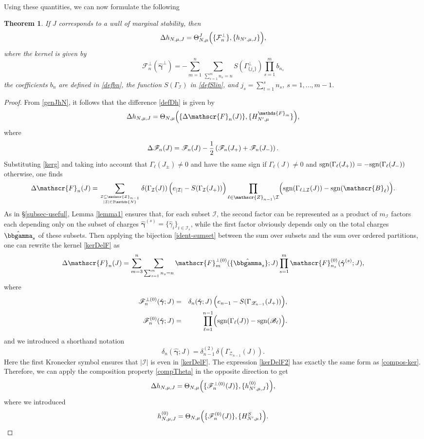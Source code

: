 \documentclass[12pt,letterpaper]{JHEP3}
\def\bea{\begin{eqnarray}}
\def\eea{\end{eqnarray}}
\def\be{\begin{equation}}
\def\ee{\end{equation}}
\newtheorem{theorem}{Theorem}%
\newcommand{\sgn}{{\rm sgn}}
\def\({\left(}
\def\){\right)}
\def\hf{{1\over 2}}
\newcommand{\cF}{\mathcal{F}}
\newcommand{\cI}{\mathcal{I}}
\newcommand{\IN}{\mathds{N}}
\newcommand{\IF}{\mathds{F}}
\def\Bv{\mathscr{B}}
\def\Fv{\mathscr{F}}
\def\Zv{\mathscr{Z}}
\newcommand{\bfgam}{{\boldsymbol \gamma}}
\def\hgam{\hat\gamma}
\def\bfhgam{\hat\bfgam}
\def\Fp{\cF^{\perp}}
\def\hbbgam{\hat\bbgamma}
\begin{document}
Using these quantities, we can now formulate the following
\begin{theorem}
\label{th-wall}
If $J$ corresponds to a wall of marginal stability, then 
\be
\Delta h_{N,\mu,J}
=\Theta^J_{N,\mu}\Bigl(\{\Fp_n\},\{h_{N',\mu,J}\}\Bigr),
\label{DelhNresh}
\ee 
where the kernel is given by
\be 
\Fp_n(\bfhgam^\perp)=-\sum_{m=1}^{n}\sum_{\sum_{s=1}^{m}n_s=n}S(\Gamma^\perp_{\{j_s\}})
\prod_{s=1}^{m} b_{n_s}
\label{kerperp}
\ee 
the coefficients $b_n$ are defined in \eqref{defbn}, the function $S(\Gamma_{\cI})$ in \eqref{defSlin}, and 
$j_s=\sum_{t=1}^s n_s$, $s=1,\dots,m-1$.
\end{theorem}
\begin{proof}
From \eqref{genJhN}, it follows that the difference \eqref{defDh} is given by 
\be
\Delta h_{N,\mu,J}
=\Theta_{N,\mu}\Bigl(\{\Delta\Fv_n(J)\},\{H^{\IF_m}_{N',\mu}\}\Bigr),
\label{DelhN-int}
\ee 	
where 
\be
\Delta\Fv_n(J)=\Fv_n(J)-\hf\(\Fv_n(J_+)+\Fv_n(J_-)\).
\ee
Substituting \eqref{kerg} and taking into account that $\Gamma_\ell(J_\pm)\ne0$ and have the same sign if $\Gamma_\ell(J)\ne 0$
and $\sgn(\Gamma_\ell(J_+))=-\sgn(\Gamma_\ell(J_-))$ otherwise, 
one finds 
\be 
\Delta\Fv_n(J)=
\sum_{\cI\subseteq\Zv_{n-1}\atop |\cI|\in 2\IN}
\delta(\Gamma_\cI(J))\,\Bigl(e_{|\cI|}-S(\Gamma_\cI(J_+))\Bigr)
\prod_{\ell\in \Zv_{n-1}\setminus \cI}\Bigl(\sgn(\Gamma_{\ell\perp\cI}(J))-\sgn(\Bv_\ell)\Bigr).
\label{kerDelF}
\ee 
As in \S\ref{subsec-useful}, Lemma \ref{lemma1} ensures that, for each subset $\cI$, 
the second factor can be represented as a product of $m_\cI$ factors each 
depending only on the subset of charges $\bfhgam^{(s)}=\{\hgam_i\}_{i\in\cI_s}$,
while the first factor obviously depends only on the total charges $\hbbgam_s$ of these subsets.
Then applying the bijection \eqref{ident-sumset} between the sum over subsets and the sum over ordered partitions,
one can rewrite the kernel \eqref{kerDelF} as
\be 
\Delta\Fv_n(J)=\sum_{m=3}^n \sum_{\sum_{s=1}^{m} n_s=n}\Fv^{\perp(0)}_m(\{\hbbgam_s\};J)
\prod_{s=1}^m\Fv^{(0)}_{n_s}(\bfhgam^{(s)};J),
\label{kerDelF2}
\ee 
where
\bea 
\Fv^{\perp(0)}_n(\bfhgam;J)&=& \delta_n(\bfhgam;J)\,\Bigl(e_{n-1}-S(\Gamma_{\Zv_{n-1}}(J_+))\Bigr),
\label{kerperpz}
\\
\Fv^{(0)}_n(\bfhgam;J)
&=&
\prod_{\ell=1}^{n-1}\Bigl(\sgn(\Gamma_\ell(J))-\sgn(\Bv_\ell)\Bigr).
\label{kerg0}
\eea
and we introduced a shorthand notation
\be 
\delta_n(\bfhgam;J)=\delta^{(2)}_{n-1}\,\delta(\Gamma_{\Zv_{n-1}}(J)).
\label{deltn}
\ee 
Here the first Kronecker symbol ensures that $|\cI|$ is even in \eqref{kerDelF}.
The expression \eqref{kerDelF2} has exactly the same form as \eqref{compos-ker}. 
Therefore, we can apply the composition property \eqref{compTheta} in the opposite direction to get 
\be
\Delta h_{N,\mu,J}
=\Theta_{N,\mu}\Bigl(\{\Fv^{\perp(0)}_n(J)\},\{h^{(0)}_{N',\mu,J}\}\Bigr),
\label{DelhNresh0}
\ee 
where we introduced  
\be 
h^{(0)}_{N,\mu,J}=\Theta_{N,\mu}\Bigl(\{\Fv^{(0)}_n(J)\},\{H^S_{N',\mu}\}\Bigr).
\label{genJhN0}
\ee 



\end{proof}
\end{document}
